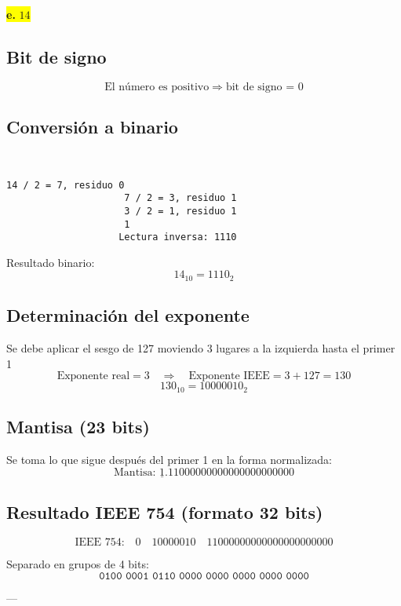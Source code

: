 \documentclass[a4paper,12pt]{article}
\begin{document}
		\begin{center}	
			\colorbox{yellow}{{\textbf{e.} $14$}}
			
			\subsection*{Bit de signo}
			
			\[
			\text{El número es positivo} \Rightarrow \text{bit de signo = } \boxed{0}
			\]
			
			\subsection*{Conversión a binario}
			~~~~~~~
			\begin{center}
				\begin{Verbatim}[formatcom=\centering]
					14 / 2 = 7, residuo 0
					 7 / 2 = 3, residuo 1
					 3 / 2 = 1, residuo 1
					 1
					Lectura inversa: 1110
				\end{Verbatim}
			\end{center}
			
			
			Resultado binario: 
			\[
			14_{10} = 1110_2
			\]
			
			\subsection*{Determinación del exponente}
			
			Se debe aplicar el sesgo de 127 moviendo 3 lugares a la izquierda hasta el primer 1
			\vspace{-0.5em}
			\[
			\text{Exponente real} = 3 \quad \Rightarrow \quad \text{Exponente IEEE} = 3 + 127 = 130
			\]
			\vspace{-0.5em}
			\[
			130_{10} = 10000010_2
			\]
			
			\subsection*{Mantisa (23 bits)}
			
			Se toma lo que sigue después del primer 1 en la forma normalizada:
			\vspace{-0.5em}
			\[
			\text{Mantisa: } \underline{1}.11000000000000000000000
			\]
			
			\subsection*{Resultado IEEE 754 (formato 32 bits)}
			
			\[
			\text{IEEE 754:} \quad 
			\boxed{0} \quad \boxed{10000010} \quad \boxed{11000000000000000000000}
			\]
			
			Separado en grupos de 4 bits:
			\vspace{-0.5em}
			\[
			\texttt{0100\ 0001\ 0110\ 0000\ 0000\ 0000\ 0000\ 0000}
			\]
			
			---	
		\end{center}
\end{document}
